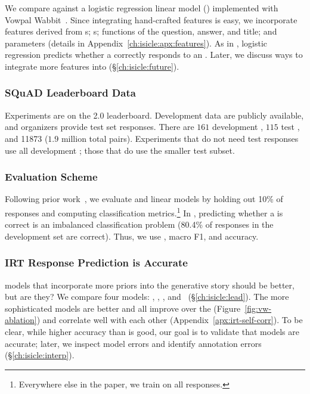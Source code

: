 We compare against a logistic regression linear model ()
implemented with Vowpal Wabbit~\citep{Agarwal2014ARE}.
%
Since integrating hand-crafted features is easy, we incorporate
features derived from \subj{} s; \itm{} s; functions
of the \squad{} question, answer, and title; and \irt{} parameters
(details in Appendix~\ref{ch:isicle:apx:features}).
%
As in \irt{}, logistic regression predicts whether a \subj{} correctly
responds to an \itm{}.
%
Later, we discuss ways to integrate more features into \irt{}
(\S\ref{ch:isicle:future}).

\subsubsection{SQuAD Leaderboard Data}
\label{ch:isicle:datasets}
Experiments are on the \squad{} 2.0 leaderboard.
Development data are publicly available, and organizers provide test set responses.
There are $161$ development \subjs{}, $115$ test \subjs{}, and \num[group-separator={,}]{11873} \itms{} ($1.9$ million total pairs).
Experiments that do not need test responses use all development \subjs{}; those that do use the smaller test subset.

\subsubsection{Evaluation Scheme}

Following prior work~\citep{wu2020virt}, we evaluate \irt{} and linear models by holding out 10\% of responses and computing classification metrics.\footnote{Everywhere else in the paper, we train on all responses.}
%
In \squad{}, predicting whether a \resp{} is correct is an imbalanced
classification problem (80.4\% of responses in the development set are
correct).
%
Thus, we use , macro F1, and accuracy.

\subsubsection{IRT Response Prediction is Accurate}
\label{ch:isicle:irt-compare}

\irt{} models that incorporate more priors into the generative story should be better, but are they?
We compare four \irt{} models: , , , and ~(\S\ref{ch:isicle:lead}).
The more sophisticated models are better and all improve over the
 (Figure~\ref{fig:vw-ablation}) and correlate well with each other (Appendix~\ref{apx:irt-self-corr}).
To be clear, while higher accuracy than  is good, our goal is to validate that \irt{} models are accurate; later, we inspect model errors and identify annotation errors (\S\ref{ch:isicle:interp}).

